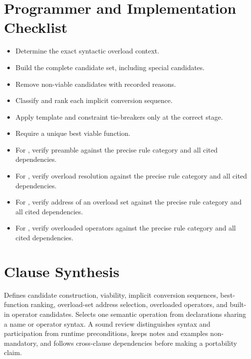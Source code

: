 \documentclass[11pt,letterpaper]{article}
\begin{document}
\section{Programmer and Implementation Checklist}
\begin{CornellReferenceChecklistBox}\begin{itemize}[label=$\square$]
\item Determine the exact syntactic overload context.
\item Build the complete candidate set, including special candidates.
\item Remove non-viable candidates with recorded reasons.
\item Classify and rank each implicit conversion sequence.
\item Apply template and constraint tie-breakers only at the correct stage.
\item Require a unique best viable function.
\item For , verify preamble against the precise rule category and all cited dependencies.
\item For , verify overload resolution against the precise rule category and all cited dependencies.
\item For , verify address of an overload set against the precise rule category and all cited dependencies.
\item For , verify overloaded operators against the precise rule category and all cited dependencies.
\end{itemize}\end{CornellReferenceChecklistBox}
\section{Clause Synthesis}
\begin{CornellReferenceOrientationBox}Defines candidate construction, viability, implicit conversion sequences, best-function ranking, overload-set address selection, overloaded operators, and built-in operator candidates. Selects one semantic operation from declarations sharing a name or operator syntax. A sound review distinguishes syntax and participation from runtime preconditions, keeps notes and examples non-mandatory, and follows cross-clause dependencies before making a portability claim.\end{CornellReferenceOrientationBox}
\end{document}
